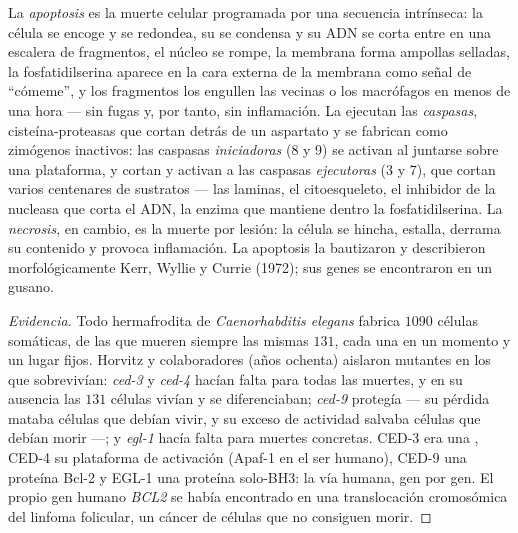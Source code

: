 \begin{definition}[Apoptosis]\label{def:b3:cell-cycle-apoptosis:apoptosis}
La \emph{apoptosis} es la muerte celular programada por una secuencia
intrínseca: la célula se encoge y se redondea, su  se condensa y
su ADN se corta entre  en una escalera de fragmentos, el
núcleo se rompe, la membrana forma ampollas selladas, la fosfatidilserina
aparece en la cara externa de la membrana como señal de ``cómeme'', y los
fragmentos los engullen las vecinas o los macrófagos en menos de una hora
--- sin fugas y, por tanto, sin inflamación. La ejecutan las
\emph{caspasas}, cisteína-proteasas que cortan detrás de un aspartato y
se fabrican como zimógenos inactivos: las caspasas \emph{iniciadoras}
(8 y 9) se activan al juntarse sobre una plataforma, y cortan y activan a
las caspasas \emph{ejecutoras} (3 y 7), que cortan varios centenares de
sustratos --- las laminas, el citoesqueleto, el inhibidor de la nucleasa
que corta el ADN, la enzima que mantiene dentro la fosfatidilserina. La
\emph{necrosis}, en cambio, es la muerte por lesión: la célula se hincha,
estalla, derrama su contenido y provoca inflamación. La apoptosis la
bautizaron y describieron morfológicamente Kerr, Wyllie y Currie (1972);
sus genes se encontraron en un gusano.
\end{definition}

\begin{proof}[Evidencia]
Todo hermafrodita de \emph{Caenorhabditis elegans} fabrica $1090$ células
somáticas, de las que mueren siempre las mismas $131$, cada una en un
momento y un lugar fijos. Horvitz y colaboradores (años ochenta) aislaron
mutantes en los que sobrevivían: \emph{ced-3} y \emph{ced-4} hacían falta
para todas las muertes, y en su ausencia las $131$ células vivían y se
diferenciaban; \emph{ced-9} protegía --- su pérdida mataba células que
debían vivir, y su exceso de actividad salvaba células que debían morir
---; y \emph{egl-1} hacía falta para muertes concretas. CED-3 era una
, CED-4 su plataforma de activación (Apaf-1 en el ser humano),
CED-9 una proteína Bcl-2 y EGL-1 una proteína solo-BH3: la vía humana,
gen por gen. El propio gen humano \emph{BCL2} se había encontrado en una
translocación cromosómica del linfoma folicular, un cáncer de células que
no consiguen morir.
\end{proof}

